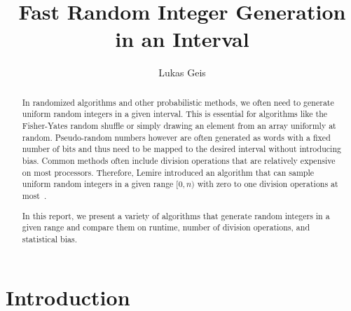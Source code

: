 \documentclass[a4paper, UKenglish, cleveref, autoref, thm-restate]{lipics-v2021}
\title{Fast Random Integer Generation in an Interval}
\author{Lukas Geis}{Goethe Universität Frankfurt am Main}{s2949316@stud.uni-frankfurt.de}{}{}
\begin{document}
\maketitle


\begin{abstract}
    In randomized algorithms and other probabilistic methods, we often need to generate uniform random integers in a given interval.
    This is essential for algorithms like the Fisher-Yates random shuffle or simply drawing an element from an array uniformly at random.
    Pseudo-random numbers however are often generated as words with a fixed number of bits and thus need to be mapped to the desired interval without introducing bias.
    Common methods often include division operations that are relatively expensive on most processors.
    Therefore, Lemire introduced an algorithm that can sample uniform random integers in a given range $[0,n)$ with zero to one division operations at most~\cite{Lemire}.

    In this report, we present a variety of algorithms that generate random integers in a given range and compare them on runtime, number of division operations, and statistical bias.
\end{abstract}


\section{Introduction}
\end{document}
